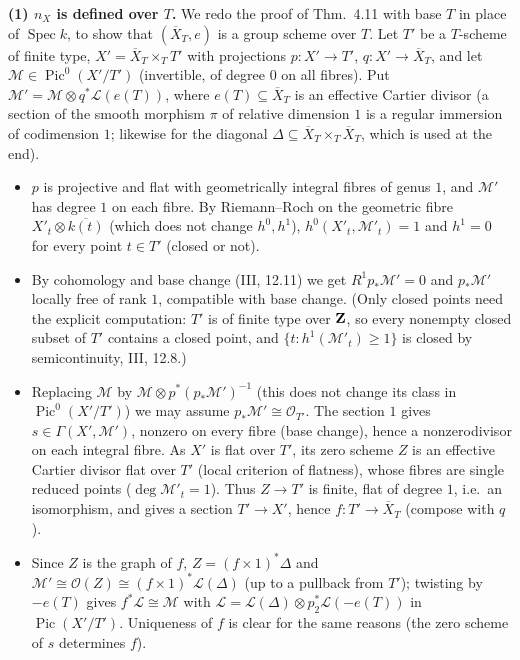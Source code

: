 \documentclass[11pt]{article}
\begin{document}
\textbf{(1) $n_X$ is defined over $T$.} We redo the proof of Thm.~4.11 with base $T$ in place of $\operatorname{Spec}k$, to show that $(\overline X_T,e)$ is a group scheme over $T$. Let $T'$ be a $T$-scheme of finite type, $X'=\overline X_T\times_TT'$ with projections $p:X'\to T'$, $q:X'\to\overline X_T$, and let $\mathcal M\in\operatorname{Pic}^0(X'/T')$ (invertible, of degree $0$ on all fibres). Put $\mathcal M'=\mathcal M\otimes q^*\mathcal L(e(T))$, where $e(T)\subseteq\overline X_T$ is an effective Cartier divisor (a section of the smooth morphism $\pi$ of relative dimension $1$ is a regular immersion of codimension $1$; likewise for the diagonal $\Delta\subseteq\overline X_T\times_T\overline X_T$, which is used at the end). 
\begin{itemize}
\item $p$ is projective and flat with geometrically integral fibres of genus $1$, and $\mathcal M'$ has degree $1$ on each fibre. By Riemann--Roch on the geometric fibre $X'_t\otimes\overline{k(t)}$ (which does not change $h^0,h^1$), $h^0(X'_t,\mathcal M'_t)=1$ and $h^1=0$ for every point $t\in T'$ (closed or not).
\item By cohomology and base change (III, 12.11) we get $R^1p_*\mathcal M'=0$ and $p_*\mathcal M'$ locally free of rank $1$, compatible with base change. (Only closed points need the explicit computation: $T'$ is of finite type over $\mathbf Z$, so every nonempty closed subset of $T'$ contains a closed point, and $\{t:h^1(\mathcal M'_t)\ge1\}$ is closed by semicontinuity, III, 12.8.)
\item Replacing $\mathcal M$ by $\mathcal M\otimes p^*(p_*\mathcal M')^{-1}$ (this does not change its class in $\operatorname{Pic}^0(X'/T')$) we may assume $p_*\mathcal M'\cong\mathcal O_{T'}$. The section $1$ gives $s\in\Gamma(X',\mathcal M')$, nonzero on every fibre (base change), hence a nonzerodivisor on each integral fibre. As $X'$ is flat over $T'$, its zero scheme $Z$ is an effective Cartier divisor flat over $T'$ (local criterion of flatness), whose fibres are single reduced points ($\deg\mathcal M'_t=1$). Thus $Z\to T'$ is finite, flat of degree $1$, i.e.\ an isomorphism, and gives a section $T'\to X'$, hence $f:T'\to\overline X_T$ (compose with $q$).
\item Since $Z$ is the graph of $f$, $Z=(f\times1)^*\Delta$ and $\mathcal M'\cong\mathcal O(Z)\cong(f\times 1)^*\mathcal L(\Delta)$ (up to a pullback from $T'$); twisting by $-e(T)$ gives $f^*\mathcal L\cong\mathcal M$ with $\mathcal L=\mathcal L(\Delta)\otimes p_2^*\mathcal L(-e(T))$ in $\operatorname{Pic}(X'/T')$. Uniqueness of $f$ is clear for the same reasons (the zero scheme of $s$ determines $f$).
\end{itemize}
\end{document}
